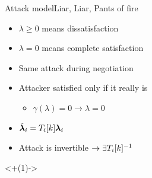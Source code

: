 \documentclass[aspectratio=169]{beamer}
\begin{document}
\begin{frame}{Attack model}{Liar, Liar, Pants of fire}
  \begin{minipage}[c]{.5\linewidth}
    \begin{itemize}[<+(1)->]
      \item $\lambda\ge 0$ means dissatisfaction
      \item $\lambda=0$ means complete satisfaction
    \end{itemize}
    \pause
    \begin{assumptions}
      \begin{itemize}[<+(1)->]
        \item Same attack during negotiation
        \item Attacker satisfied only if it really is
              \begin{itemize}
                \item $\gamma(\lambda)=0\rightarrow \lambda=0$
              \end{itemize}
        \item $\tilde{\boldsymbol{\lambda}}_{i}=T_{i}[k]\boldsymbol{\lambda}_{i}$
      \end{itemize}
    \end{assumptions}
    \begin{itemize}[<+(1)->]
      \item Attack is invertible $\to \exists T_{i}[k]^{-1}$
    \end{itemize}
  \end{minipage}
  \hfill
  \begin{minipage}[c]{.4\linewidth}
    \onslide<+(1)->{
    }
  \end{minipage}
\end{frame}
\end{document}

